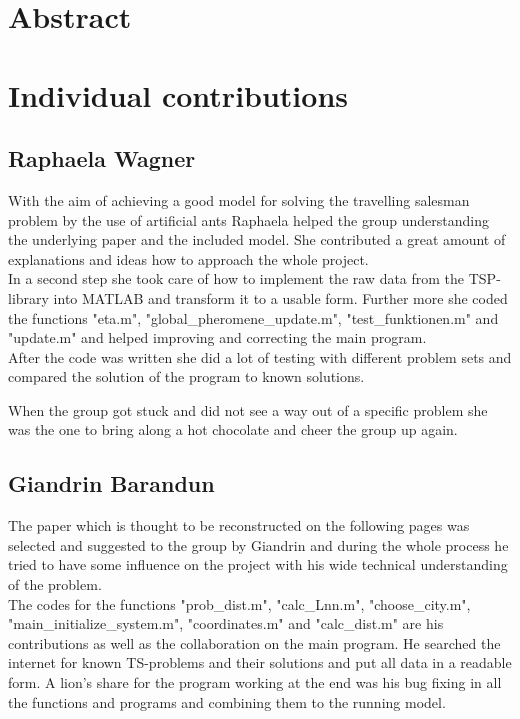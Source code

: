 \documentclass[11pt]{article}
\begin{document}
\section{Abstract}

\section{Individual contributions}
\subsection{Raphaela Wagner}
With the aim of achieving a good model for solving the travelling salesman problem by the use of artificial ants Raphaela helped the group understanding the underlying paper and the included model. She contributed a great amount of explanations and ideas how to approach the whole project. \\
In a second step she took care of how to implement the raw data from the TSP-library into MATLAB and transform it to a usable form. Further more she coded the functions "eta.m", "global\_pheromene\_update.m", "test\_funktionen.m" and "update.m" and helped improving and correcting the main program. \\
After the code was written she did a lot of testing with different problem sets and compared the solution of the program to known solutions. 

When the group got stuck and did not see a way out of a specific problem she was the one to bring along a hot chocolate and cheer the group up again.

\subsection{Giandrin Barandun}
The paper which is thought to be reconstructed on the following pages was selected and suggested to the group by Giandrin and during the whole process he tried to have some influence on the project with his wide technical understanding of the problem. \\
The codes for the functions "prob\_dist.m", "calc\_Lnn.m", "choose\_city.m", "main\_initialize\_system.m", "coordinates.m" and "calc\_dist.m" are his contributions as well as the collaboration on the main program. He searched the internet for known TS-problems and their solutions and put all data in a readable form. A lion's share for the program working at the end was his bug fixing in all the functions and programs and combining them to the running model.
\end{document}
